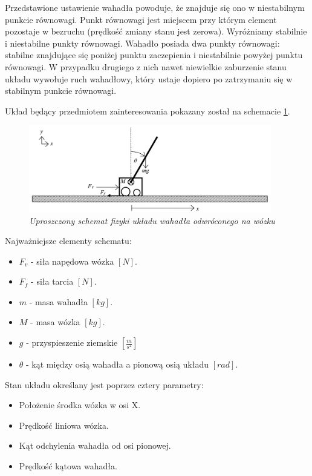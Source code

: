 \documentclass[12pt, oneside]{report}
\theoremstyle{definition}
\begin{document}
Przedstawione ustawienie wahadła powoduje, że znajduje się ono w niestabilnym punkcie równowagi. Punkt równowagi jest miejscem przy którym element pozostaje w bezruchu (prędkość zmiany stanu jest zerowa). Wyróżniamy stabilnie i niestabilne punkty równowagi. Wahadło posiada dwa punkty równowagi: stabilne znajdujące się poniżej punktu zaczepienia i niestabilnie powyżej punktu równowagi. W przypadku drugiego z nich nawet niewielkie zaburzenie stanu układu wywołuje ruch wahadłowy, który ustaje dopiero po zatrzymaniu się w stabilnym punkcie równowagi. 


Układ będący przedmiotem zainteresowania pokazany został na schemacie \ref{SytemSchemeImage}.

\begin{figure}[H]
	\centering
		\includegraphics[width = 300pt]{SystemScheme} 
		\caption{\textit{Uproszczony schemat fizyki układu wahadła odwróconego na wózku \cite{LMIP} }}
		\label{SytemSchemeImage}
\end{figure}

Najważniejsze elementy schematu:
\begin{itemize}
\item \(F_v\) - siła napędowa wózka \([N]\).
\item \(F_f\) - siła tarcia \([N]\).
\item \(m\) - masa wahadła \([kg]\). 
\item \(M\) - masa wózka \([kg]\).
\item \(g\) - przyspieszenie ziemskie \([\frac{m}{s^2}]\) 
\item \(\theta\) - kąt między osią wahadła a pionową osią układu \([rad]\).
\end{itemize}

Stan układu określany jest poprzez cztery parametry:
\begin{itemize}
\item Położenie środka wózka w osi X.
\item Prędkość liniowa wózka.
\item Kąt odchylenia wahadła od osi pionowej.
\item Prędkość kątowa wahadła.
\end{itemize}
\end{document}
